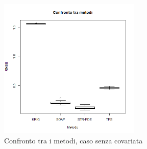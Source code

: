 \documentclass[a4paper,11pt,twoside,openright]{book}							%
\begin{document}
\begin{figure}[t]
	\centering
	\includegraphics[width=0.60\textwidth]{Immagini/Confronto_metodi.png}   
	\caption{Confronto tra i metodi, caso senza covariata}
	\label{fig:cfr}
\end{figure}
\end{document}
